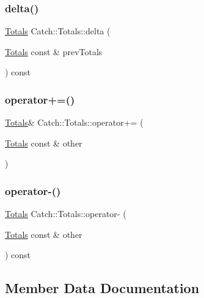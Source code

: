 \subsubsection{\texorpdfstring{delta()}{delta()}}
{\footnotesize\ttfamily \mbox{\hyperlink{struct_catch_1_1_totals}{Totals}} Catch\+::\+Totals\+::delta (\begin{DoxyParamCaption}\item[{\mbox{\hyperlink{struct_catch_1_1_totals}{Totals}} const \&}]{prev\+Totals }\end{DoxyParamCaption}) const}

\mbox{\label{struct_catch_1_1_totals_a574015076e54cc405c70b053e3356e43}} 
\subsubsection{\texorpdfstring{operator+=()}{operator+=()}}
{\footnotesize\ttfamily \mbox{\hyperlink{struct_catch_1_1_totals}{Totals}}\& Catch\+::\+Totals\+::operator+= (\begin{DoxyParamCaption}\item[{\mbox{\hyperlink{struct_catch_1_1_totals}{Totals}} const \&}]{other }\end{DoxyParamCaption})}

\mbox{\label{struct_catch_1_1_totals_a9279ed39139cb7e7b291918a6d08290e}} 
\subsubsection{\texorpdfstring{operator-\/()}{operator-()}}
{\footnotesize\ttfamily \mbox{\hyperlink{struct_catch_1_1_totals}{Totals}} Catch\+::\+Totals\+::operator-\/ (\begin{DoxyParamCaption}\item[{\mbox{\hyperlink{struct_catch_1_1_totals}{Totals}} const \&}]{other }\end{DoxyParamCaption}) const}



\subsection{Member Data Documentation}
\mbox{\label{struct_catch_1_1_totals_a885ded66df752147b30c3d45aa602ec9}} 
